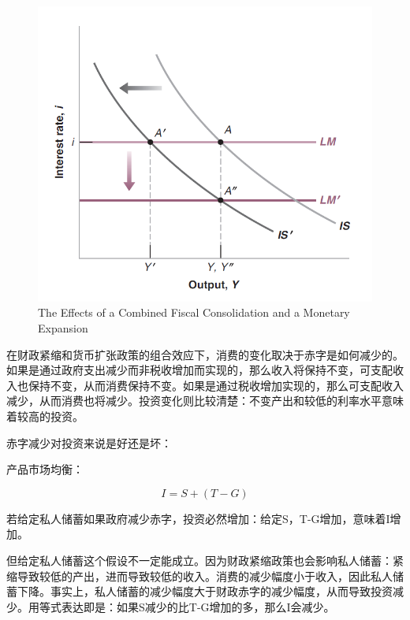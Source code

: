 \documentclass{article}
\begin{document}
\begin{figure}[H] %
	\centering %
	\includegraphics[width=1\textwidth]{5_7} %
	\caption{The Effects of a Combined
		Fiscal Consolidation and
		a Monetary Expansion} %
	\label{Fig.main8} %
\end{figure}

在财政紧缩和货币扩张政策的组合效应下，消费的变化取决于赤字是如何减少的。如果是通过政府支出减少而非税收增加而实现的，那么收入将保持不变，可支配收入也保持不变，从而消费保持不变。如果是通过税收增加实现的，那么可支配收入减少，从而消费也将减少。投资变化则比较清楚：不变产出和较低的利率水平意味着较高的投资。

\hspace*{\fill}

赤字减少对投资来说是好还是坏：

产品市场均衡：

\[
I=S+(T-G)
\]

若给定私人储蓄如果政府减少赤字，投资必然增加：给定S，T-G增加，意味着I增加。

但给定私人储蓄这个假设不一定能成立。因为财政紧缩政策也会影响私人储蓄：紧缩导致较低的产出，进而导致较低的收入。消费的减少幅度小于收入，因此私人储蓄下降。事实上，私人储蓄的减少幅度大于财政赤字的减少幅度，从而导致投资减少。用等式表达即是：如果S减少的比T-G增加的多，那么I会减少。
\end{document}
